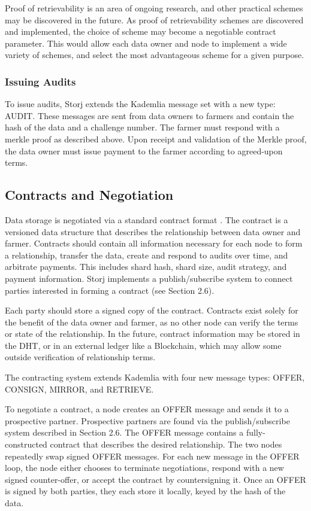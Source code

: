 \documentclass[a4paper,10pt]{article}
\begin{document}
Proof of retrievability is an area of ongoing research, and other practical schemes may be discovered in the future. As proof of retrievability schemes are discovered and implemented, the choice of scheme may become a negotiable contract parameter. This would allow each data owner and node to implement a wide variety of schemes, and select the most advantageous scheme for a given purpose.

\subsubsection{Issuing Audits}
To issue audits, Storj extends the Kademlia message set with a new type: AUDIT. These messages are sent from data owners to farmers and contain the hash of the data and a challenge number. The farmer must respond with a merkle proof as described above. Upon receipt and validation of the Merkle proof, the data owner must issue payment to the farmer according to agreed-upon terms.


\subsection{Contracts and Negotiation}
Data storage is negotiated via a standard contract format \cite{7}. The contract is a versioned data structure that describes the relationship between data owner and farmer. Contracts should contain all information necessary for each node to form a relationship, transfer the data, create and respond to audits over time, and arbitrate payments. This includes shard hash, shard size, audit strategy, and payment information. Storj implements a publish/subscribe system to connect parties interested in forming a contract (see Section 2.6).

Each party should store a signed copy of the contract. Contracts exist solely for the benefit of the data owner and farmer, as no other node can verify the terms or state of the relationship. In the future, contract information may be stored in the DHT, or in an external ledger like a Blockchain, which may allow some outside verification of relationship terms.

The contracting system extends Kademlia with four new message types: OFFER, CONSIGN, MIRROR, and RETRIEVE.

To negotiate a contract, a node creates an OFFER message and sends it to a prospective partner. Prospective partners are found via the publish/subscribe system described in Section 2.6. The OFFER message contains a fully-constructed contract that describes the desired relationship. The two nodes repeatedly swap signed OFFER messages. For each new message in the OFFER loop, the node either chooses to terminate negotiations, respond with a new signed counter-offer, or accept the contract by countersigning it. Once an OFFER is signed by both parties, they each store it locally, keyed by the hash of the data.
\end{document}
